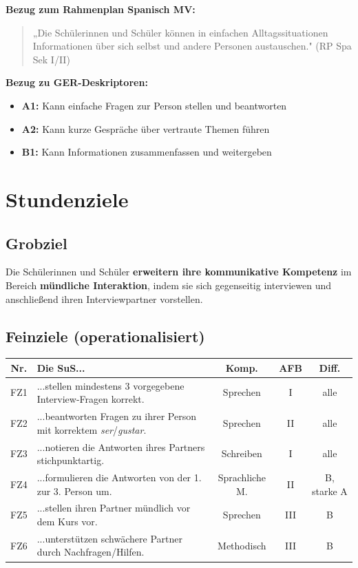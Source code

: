 \documentclass[11pt, a4paper]{article}
\newcommand{\es}[1]{\textcolor{spanisch}{\textit{#1}}}
\begin{document}
\textbf{Bezug zum Rahmenplan Spanisch MV:}
\begin{quote}
    „Die Schülerinnen und Schüler können in einfachen Alltagssituationen Informationen über sich selbst und andere Personen austauschen." (RP Spa Sek I/II)
\end{quote}

\textbf{Bezug zu GER-Deskriptoren:}
\begin{itemize}[leftmargin=2em]
    \item \textbf{A1:} Kann einfache Fragen zur Person stellen und beantworten
    \item \textbf{A2:} Kann kurze Gespräche über vertraute Themen führen
    \item \textbf{B1:} Kann Informationen zusammenfassen und weitergeben
\end{itemize}


\section{Stundenziele}

\subsection{Grobziel}

Die Schülerinnen und Schüler \textbf{erweitern ihre kommunikative Kompetenz} im Bereich \textbf{mündliche Interaktion}, indem sie sich gegenseitig interviewen und anschließend ihren Interviewpartner vorstellen.

\subsection{Feinziele (operationalisiert)}

\begin{center}
\small
\begin{tabularx}{\textwidth}{|c|X|c|c|c|}
    \hline
    \textbf{Nr.} & \textbf{Die SuS...} & \textbf{Komp.} & \textbf{AFB} & \textbf{Diff.} \\
    \hline
    FZ1 & ...stellen mindestens 3 vorgegebene Interview-Fragen korrekt. & Sprechen & I & alle \\
    \hline
    FZ2 & ...beantworten Fragen zu ihrer Person mit korrektem \es{ser}/\es{gustar}. & Sprechen & II & alle \\
    \hline
    FZ3 & ...notieren die Antworten ihres Partners stichpunktartig. & Schreiben & I & alle \\
    \hline
    FZ4 & ...formulieren die Antworten von der 1. zur 3. Person um. & Sprachliche M. & II & B, starke A \\
    \hline
    FZ5 & ...stellen ihren Partner mündlich vor dem Kurs vor. & Sprechen & III & B \\
    \hline
    FZ6 & ...unterstützen schwächere Partner durch Nachfragen/Hilfen. & Methodisch & III & B \\
    \hline
\end{tabularx}
\end{center}
\end{document}
